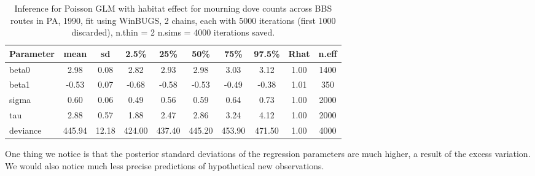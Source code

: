 \begin{table}
\caption{Inference for Poisson GLM with habitat effect for mourning dove counts across BBS routes in PA, 1990, fit using WinBUGS,
 2 chains, each with 5000 iterations (first 1000 discarded), n.thin = 2
 n.sims = 4000 iterations saved.}
   \scriptsize
  \begin{tabular}{lccccccccc}
    \hline
        \hline
 Parameter &    mean   & sd   &  2.5\%    &  25\%  &    50\%   &   75\%  &  97.5\% & Rhat & n.eff \\
     \hline
beta0   &   2.98 & 0.08 &  2.82 &  2.93  & 2.98 &  3.03 &  3.12 & 1.00 & 1400 \\
beta1   &  -0.53 & 0.07 & -0.68 & -0.58 & -0.53 & -0.49 & -0.38 & 1.01 &  350 \\
sigma   &   0.60 & 0.06 &  0.49 &  0.56 &  0.59 &  0.64 &  0.73 & 1.00 & 2000 \\
tau     &   2.88 & 0.57 &  1.88 &  2.47 &  2.86 &  3.24 &  4.12 & 1.00 & 2000 \\
deviance & 445.94 & 12.18 & 424.00 & 437.40 & 445.20 & 453.90 & 471.50 & 1.00 & 4000 \\
    \hline
  \end{tabular}
  \label{glms.tab.bbspoisreg}
\vspace{0.5cm}
\end{table}



One thing we notice is
that the posterior standard deviations of the regression parameters
are much higher, a result of the excess variation. We would also
notice much less precise predictions of hypothetical new
observations.




